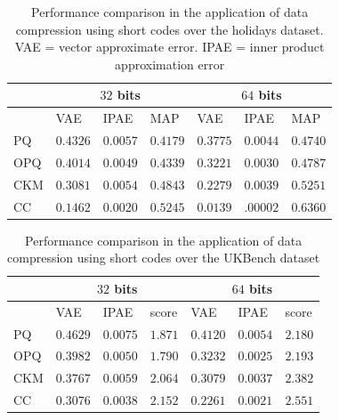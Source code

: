 \documentclass[10pt, letterpaper]{article}
\begin{document}
\setlength{\tabcolsep}{4pt}
\begin{table}[!t]
\begin{center}
\caption{Performance comparison in the application of data
compression using short codes over the holidays dataset.
VAE = vector approximate error.
IPAE = inner product approximation
error}
\footnotesize
\label{tab:Holidayclassification}
\begin{tabular}{ l|lll |lll}
   \hline
   & \multicolumn{3}{c|}{$32$ bits} & \multicolumn{3}{c}{$64$ bits} \\
   \hline
   & VAE & IPAE & MAP & VAE & IPAE & MAP  \\
   \hline
   PQ & $0.4326$ & $0.0057$ & $0.4179$ & $0.3775$ & $0.0044$ & $0.4740$ \\
   OPQ & $0.4014$ & $0.0049$ & $0.4339$ & $0.3221$ & $0.0030$ & $0.4787$\\
   CKM & $0.3081$ & $0.0054$ & $0.4843$ & $0.2279$ & $0.0039$ & $0.5251$\\
   CC & $0.1462$ & $0.0020$  &  $0.5245$ & $0.0139$ & $.00002$  & $0.6360$ \\
   \hline
\end{tabular}
\end{center}
\vspace{-.5cm}
\end{table}
\setlength{\tabcolsep}{1.4pt}

\setlength{\tabcolsep}{4pt}
\begin{table}[!h]
\begin{center}
\caption{Performance comparison in the application of data
compression using short codes over the UKBench dataset}
\label{tab:UKBclassification}
\footnotesize
\begin{tabular}{ l|lll |lll}
   \hline
   & \multicolumn{3}{c|}{$32$ bits} & \multicolumn{3}{c}{$64$ bits} \\
   \hline
   & VAE & IPAE & score & VAE & IPAE & score  \\
   \hline
   PQ & $0.4629$ & $0.0075$ & $1.871$ & $0.4120$ & $0.0054$ &  $2.180$  \\
   OPQ & $0.3982$ & $0.0050$ & $1.790$ & $0.3232$ & $0.0025$ & $2.193$ \\
   CKM& $0.3767$ & $0.0059$ & $2.064$ & $0.3079$ & $0.0037$ & $2.382$ \\
   CC & $0.3076$ & $0.0038$  & $2.152$ & $0.2261$ & $0.0021$  & $2.551$ \\
   \hline
\end{tabular}
\vspace{-.5cm}
\end{center}
\end{table}
\setlength{\tabcolsep}{1.4pt}
\end{document}
